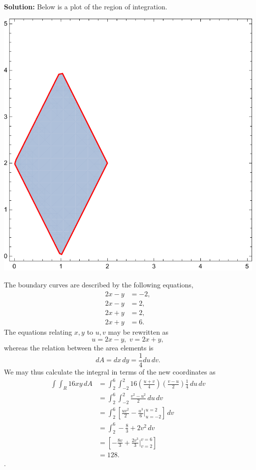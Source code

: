 \documentclass[12pt,oneside]{exam}
\newenvironment{newsolution}{\vspace{.1in}\noindent\textbf{Solution: \hspace{.05em}}}{}
\begin{document}
\begin{newsolution}
Below is a plot of the region of integration.
\begin{center}
\includegraphics[scale=0.5]{p13.pdf}
\end{center}
The boundary curves are described by the following equations, 
\begin{align*}
2x-y & = -2, \\
2x-y & = 2, \\
2x + y & = 2, \\
2x+y & = 6.
\end{align*}
The equations relating $x,y$ to $u,v$ may be rewritten as 
\begin{equation*}
u  = 2x-y, \, \, v  = 2x+y,
\end{equation*}
whereas the relation between the area elements is
\begin{equation*}
dA = dx \, dy = \frac{1}{4} du \, dv.
\end{equation*}
We may thus calculate the integral in terms of the new coordinates as 
\begin{align*}
\int \int_{R} 16xy \, dA & = \int_{2}^{6}\int_{-2}^{2}  16\left(\frac{u+v}{4}\right)\left(\frac{v-u}{2}\right) \frac{1}{4} \, du \, dv \\
& = \int_{2}^{6} \int_{-2}^{2}  \frac{v^2-u^2}{2} \, du \, dv \\
& = \int_{2}^{6} \left[ \frac{uv^2}{2} - \frac{u^3}{6} \Big|_{u=-2}^{u=2} \right] \, dv \\
& = \int_{2}^{6} -\frac{8}{3} + 2v^2 \, dv \\
& = \left[-\frac{8v}{3} + \frac{2v^3}{3} \Big|_{v=2}^{v=6} \right] \\
& = 128.
\end{align*}
\end{newsolution}. 
\end{document}
